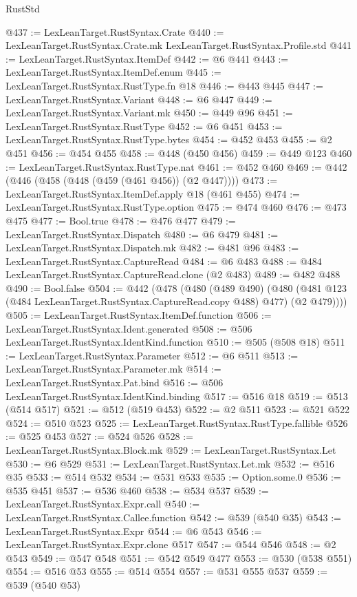\begin{lexlean}{RustStd}
\begin{coremodule}
{\begin{coremodule}
{{{{{{{{{{{{{{@437 := LexLeanTarget.RustSyntax.Crate
@440 := LexLeanTarget.RustSyntax.Crate.mk LexLeanTarget.RustSyntax.Profile.std
@441 := LexLeanTarget.RustSyntax.ItemDef
@442 := @6 @441
@443 := LexLeanTarget.RustSyntax.ItemDef.enum
@445 := LexLeanTarget.RustSyntax.RustType.fn @18
@446 := @443 @445
@447 := LexLeanTarget.RustSyntax.Variant
@448 := @6 @447
@449 := LexLeanTarget.RustSyntax.Variant.mk
@450 := @449 @96
@451 := LexLeanTarget.RustSyntax.RustType
@452 := @6 @451
@453 := LexLeanTarget.RustSyntax.RustType.bytes
@454 := @452 @453
@455 := @2 @451
@456 := @454 @455
@458 := @448 (@450 @456)
@459 := @449 @123
@460 := LexLeanTarget.RustSyntax.RustType.nat
@461 := @452 @460
@469 := @442 (@446 (@458 (@448 (@459 (@461 @456)) (@2 @447))))
@473 := LexLeanTarget.RustSyntax.ItemDef.apply @18 (@461 @455)
@474 := LexLeanTarget.RustSyntax.RustType.option
@475 := @474 @460
@476 := @473 @475
@477 := Bool.true
@478 := @476 @477
@479 := LexLeanTarget.RustSyntax.Dispatch
@480 := @6 @479
@481 := LexLeanTarget.RustSyntax.Dispatch.mk
@482 := @481 @96
@483 := LexLeanTarget.RustSyntax.CaptureRead
@484 := @6 @483
@488 := @484 LexLeanTarget.RustSyntax.CaptureRead.clone (@2 @483)
@489 := @482 @488
@490 := Bool.false
@504 := @442
    (@478
      (@480
        (@489 @490)
        (@480 (@481 @123 (@484 LexLeanTarget.RustSyntax.CaptureRead.copy @488) @477) (@2 @479))))
@505 := LexLeanTarget.RustSyntax.ItemDef.function
@506 := LexLeanTarget.RustSyntax.Ident.generated
@508 := @506 LexLeanTarget.RustSyntax.IdentKind.function
@510 := @505 (@508 @18)
@511 := LexLeanTarget.RustSyntax.Parameter
@512 := @6 @511
@513 := LexLeanTarget.RustSyntax.Parameter.mk
@514 := LexLeanTarget.RustSyntax.Pat.bind
@516 := @506 LexLeanTarget.RustSyntax.IdentKind.binding
@517 := @516 @18
@519 := @513 (@514 @517)
@521 := @512 (@519 @453)
@522 := @2 @511
@523 := @521 @522
@524 := @510 @523
@525 := LexLeanTarget.RustSyntax.RustType.fallible
@526 := @525 @453
@527 := @524 @526
@528 := LexLeanTarget.RustSyntax.Block.mk
@529 := LexLeanTarget.RustSyntax.Let
@530 := @6 @529
@531 := LexLeanTarget.RustSyntax.Let.mk
@532 := @516 @35
@533 := @514 @532
@534 := @531 @533
@535 := Option.some.{0}
@536 := @535 @451
@537 := @536 @460
@538 := @534 @537
@539 := LexLeanTarget.RustSyntax.Expr.call
@540 := LexLeanTarget.RustSyntax.Callee.function
@542 := @539 (@540 @35)
@543 := LexLeanTarget.RustSyntax.Expr
@544 := @6 @543
@546 := LexLeanTarget.RustSyntax.Expr.clone @517
@547 := @544 @546
@548 := @2 @543
@549 := @547 @548
@551 := @542 @549 @477
@553 := @530 (@538 @551)
@554 := @516 @53
@555 := @514 @554
@557 := @531 @555 @537
@559 := @539 (@540 @53)
}}}}}}}}}}}}}}
\end{coremodule}}
\end{coremodule}
\end{lexlean}
